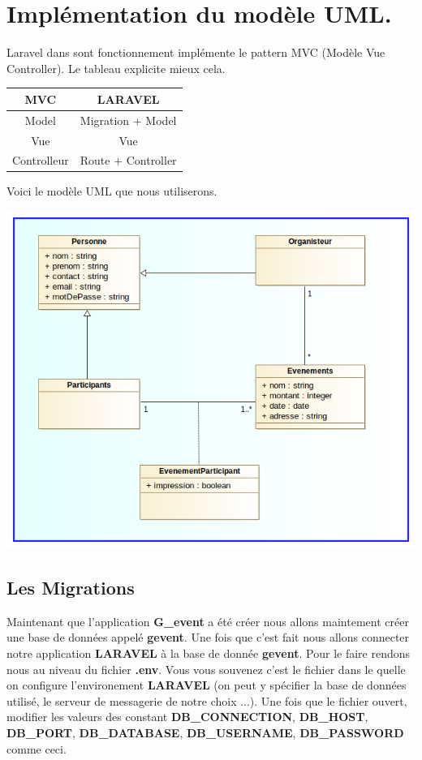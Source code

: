 \documentclass[12pt,a4paper]{article}
\begin{document}
\section{Implémentation du modèle UML.}
Laravel dans sont fonctionnement implémente le pattern MVC (Modèle Vue Controller). Le tableau
explicite mieux cela.
\begin{center}
\begin{tabular}{|c|c|}
\hline 
MVC & LARAVEL \\ 
\hline 
Model & Migration + Model \\ 
\hline 
Vue & Vue \\ 
\hline 
Controlleur & Route + Controller \\ 
\hline 
\end{tabular} 
\end{center}
Voici le modèle UML que nous utiliserons.
\begin{center}
\includegraphics[scale=0.7]{img/model.png}
\end{center} 
\subsection{Les Migrations}
Maintenant que l'application \textbf{G\_event} a été créer nous allons maintement créer une base de données appelé \textbf{gevent}. Une fois que c'est fait nous allons connecter notre application \textbf{LARAVEL} à la base de donnée \textbf{gevent}. Pour le faire rendons nous au niveau du fichier
\textbf{.env}. Vous vous souvenez c'est le fichier dans le quelle on configure l'environement \textbf{LARAVEL} (on peut y spécifier la base de données utilisé, le serveur
de messagerie de notre choix ...). Une fois que le fichier ouvert, modifier les valeurs des
constant \textbf{DB\_CONNECTION}, \textbf{DB\_HOST}, \textbf{DB\_PORT}, \textbf{DB\_DATABASE}, \textbf{DB\_USERNAME}, \textbf{DB\_PASSWORD} comme ceci.
\end{document}
